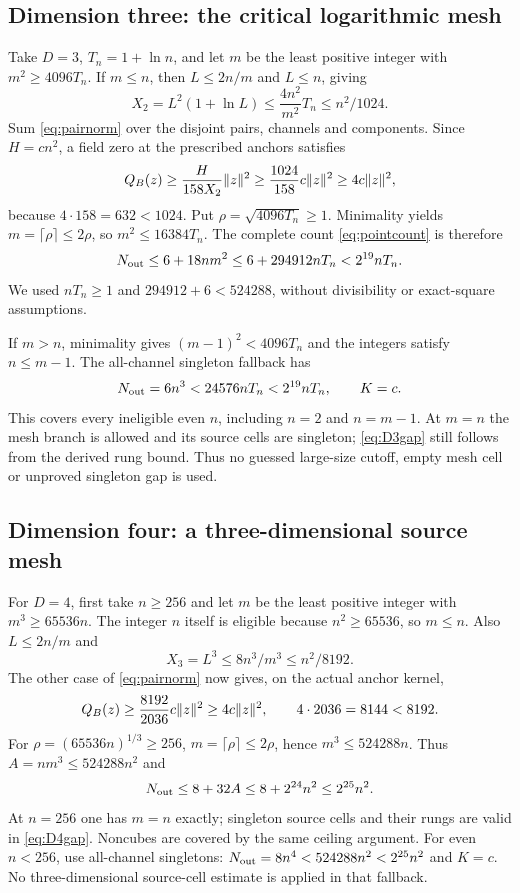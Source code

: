 \subsection{Dimension three: the critical logarithmic mesh}
Take $D=3$, $T_n=1+\ln n$, and let $m$ be the least positive integer with
$m^2\geq4096T_n$. If $m\leq n$, then $L\leq2n/m$ and $L\leq n$, giving
\[
 X_2=L^2(1+\ln L)\leq\frac{4n^2}{m^2}T_n\leq n^2/1024.
\]
Sum \eqref{eq:pairnorm} over the disjoint pairs, channels and components.
Since $H=cn^2$, a field zero at the prescribed anchors satisfies
\begin{equation}\label{eq:D3gap}
 Q_B(z)\geq\frac{H}{158X_2}\lVert z\rVert^2
          \geq\frac{1024}{158}c\lVert z\rVert^2\geq4c\lVert z\rVert^2,
\end{equation}
because $4\cdot158=632<1024$. Put $\rho=\sqrt{4096T_n}\geq1$.
Minimality yields $m=\lceil\rho\rceil\leq2\rho$, so $m^2\leq16384T_n$.
The complete count \eqref{eq:pointcount} is therefore
\[
 N_{\rm out}\leq6+18nm^2\leq6+294912nT_n<2^{19}nT_n.
\]
We used $nT_n\geq1$ and $294912+6<524288$, without divisibility or exact-square
assumptions.

If $m>n$, minimality gives $(m-1)^2<4096T_n$ and the integers satisfy
$n\leq m-1$. The all-channel singleton fallback has
\[
 N_{\rm out}=6n^3<24576nT_n<2^{19}nT_n,\qquad K=c.
\]
This covers every ineligible even $n$, including $n=2$ and $n=m-1$.
At $m=n$ the mesh branch is allowed and its source cells are singleton;
\eqref{eq:D3gap} still follows from the derived rung bound. Thus no guessed
large-size cutoff, empty mesh cell or unproved singleton gap is used.

\subsection{Dimension four: a three-dimensional source mesh}
For $D=4$, first take $n\geq256$ and let $m$ be the least positive integer
with $m^3\geq65536n$. The integer $n$ itself is eligible because
$n^2\geq65536$, so $m\leq n$. Also $L\leq2n/m$ and
\[
 X_3=L^3\leq8n^3/m^3\leq n^2/8192.
\]
The other case of \eqref{eq:pairnorm} now gives, on the actual anchor kernel,
\begin{equation}\label{eq:D4gap}
 Q_B(z)\geq\frac{8192}{2036}c\lVert z\rVert^2\geq4c\lVert z\rVert^2,
 \qquad4\cdot2036=8144<8192.
\end{equation}
For $\rho=(65536n)^{1/3}\geq256$, $m=\lceil\rho\rceil\leq2\rho$, hence
$m^3\leq524288n$. Thus $A=nm^3\leq524288n^2$ and
\[
 N_{\rm out}\leq8+32A\leq8+2^{24}n^2\leq2^{25}n^2.
\]
At $n=256$ one has $m=n$ exactly; singleton source cells and their rungs
are valid in \eqref{eq:D4gap}. Noncubes are covered by the same ceiling
argument. For even $n<256$, use all-channel singletons:
$N_{\rm out}=8n^4<524288n^2<2^{25}n^2$ and $K=c$.
No three-dimensional source-cell estimate is applied in that fallback.

